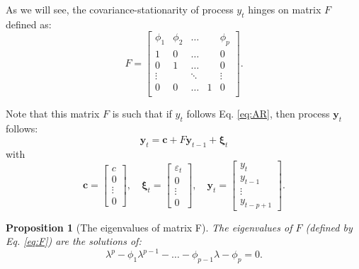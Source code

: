 \documentclass[
  11pt,
]{book}
\newtheorem{proposition}{Proposition}[chapter]
\theoremstyle{definition}
\theoremstyle{definition}
\theoremstyle{definition}
\theoremstyle{definition}
\theoremstyle{remark}
\begin{document}
As we will see, the covariance-stationarity of process \(y_t\) hinges on matrix \(F\) defined as:
\begin{equation}
F = \left[
\begin{array}{ccccc}
\phi_1 & \phi_2 & \dots& & \phi_p \\
1 & 0 &\dots && 0 \\
0 & 1 &\dots && 0 \\
\vdots &  & \ddots && \vdots \\
0 & 0 &\dots &1& 0 \\
\end{array}
\right].\label{eq:F}
\end{equation}

Note that this matrix \(F\) is such that if \(y_t\) follows Eq. \eqref{eq:AR}, then process \(\mathbf{y}_t\) follows:
\[
\mathbf{y}_t = \mathbf{c} + F \mathbf{y}_{t-1} + \boldsymbol\xi_t
\]
with
\[
\mathbf{c} =
\left[\begin{array}{c}
c\\
0\\
\vdots\\
0
\end{array}\right],
\quad
\boldsymbol\xi_t =
\left[\begin{array}{c}
\varepsilon_t\\
0\\
\vdots\\
0
\end{array}\right],
\quad
\mathbf{y}_t =
\left[\begin{array}{c}
y_t\\
y_{t-1}\\
\vdots\\
y_{t-p+1}
\end{array}\right].
\]

\begin{proposition}[The eigenvalues of matrix F]
\protect\hypertarget{prp:Feigen}{}\label{prp:Feigen}The eigenvalues of \(F\) (defined by Eq. \eqref{eq:F}) are the solutions of:
\begin{equation}
\lambda^p - \phi_1 \lambda^{p-1} - \dots - \phi_{p-1}\lambda - \phi_p = 0.\label{eq:Feigen}
\end{equation}
\end{proposition}
\end{document}
